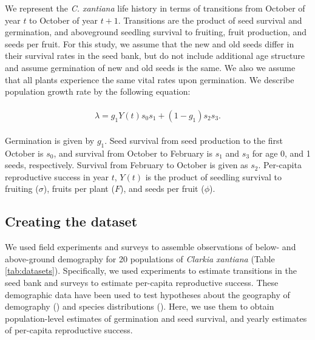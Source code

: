 \documentclass[12pt, oneside, titlepage]{article}   	%
\begin{document}
{We represent the \textit{C. xantiana} life history in terms of transitions from October of year $t$ to October of year $t+1$. Transitions are the product of seed survival and germination, and aboveground seedling survival to fruiting, fruit production, and seeds per fruit. For this study, we assume that the new and old seeds differ in their survival rates in the seed bank, but do not include additional age structure and assume germination of new and old seeds is the same. We also we assume that all plants experience the same vital rates upon germination. We describe population growth rate by the following equation:

 \begin{align}
  \begin{split}
\lambda = g_1Y(t) s_0 s_1 + (1-g_1) s_2 s_3.  \label{eq:di-equation}
  \end{split}
\end{align}

Germination is given by $g_1$. Seed survival from seed production to the first October is $s_0$, and survival from October to February is $s_1$ and $s_3$ for age 0, and 1 seeds, respectively. Survival from February to October is given as $s_2$. Per-capita reproductive success in year $t$, $Y(t)$ is the product of seedling survival to fruiting ($\sigma$), fruits per plant ($F$), and seeds per fruit ($\phi$).

\subsection{Creating the dataset}

We used field experiments and surveys to assemble observations of below- and above-ground demography for 20 populations of \textit{Clarkia xantiana} (Table \ref{tab:datasets}). Specifically, we used experiments to estimate transitions in the seed bank and surveys to estimate per-capita reproductive success. These demographic data have been used to test hypotheses about the geography of demography (\cite{eckhart2011}) and species distributions (\cite{pironon2018}). Here, we use them to obtain population-level estimates of germination and seed survival, and yearly estimates of per-capita reproductive success.

}
\end{document}
